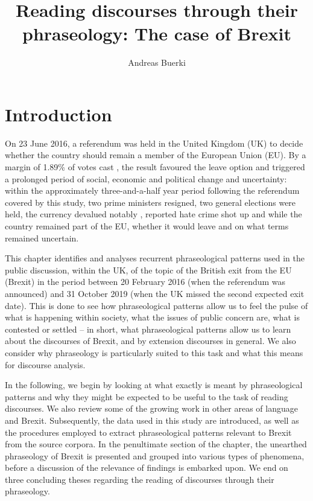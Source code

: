 \documentclass[output=paper]{langscibook}
\author{Andreas Buerki\affiliation{Cardiff University}}
\title[Reading discourses through their phraseology]{Reading discourses through their phraseology: The case of Brexit}
\begin{document}
\maketitle 

\section{Introduction}

On 23 June 2016, a referendum was held in the United Kingdom (UK) to decide whether the country should remain a member of the European Union (EU). By a margin of 1.89\% of votes cast \parencite{ElectoralCommission2019}, the result favoured the leave option and triggered a prolonged period of social, economic and political change and uncertainty: within the approximately three-and-a-half year period following the referendum covered by this study, two prime ministers resigned, two general elections were held, the currency devalued notably \citep{fullfact.org2019a}, reported hate crime shot up \citep{fullfact.org2019b} and while the country remained part of the EU, whether it would leave and on what terms remained uncertain.

This chapter identifies and analyses recurrent phraseological patterns used in the public discussion, within the UK, of the topic of the British exit from the EU (Brexit) in the period between 20 February 2016 (when the referendum was announced) and 31 October 2019 (when the UK missed the second expected exit date). This is done to see how phraseological patterns allow us to feel the pulse of what is happening within society, what the issues of public concern are, what is contested or settled -- in short, what phraseological patterns allow us to learn about the discourses of Brexit, and by extension discourses in general. We also consider why phraseology is particularly suited to this task and what this means for discourse analysis.

In the following, we begin by looking at what exactly is meant by phraseological patterns and why they might be expected to be useful to the task of reading discourses. We also review some of the growing work in other areas of language and Brexit. Subsequently, the data used in this study are introduced, as well as the procedures employed to extract phraseological patterns relevant to Brexit from the source corpora. In the penultimate section of the chapter, the unearthed phraseology of Brexit is presented and grouped into various types of phenomena, before a discussion of the relevance of findings is embarked upon. We end on three concluding theses regarding the reading of discourses through their phraseology.
\end{document}
